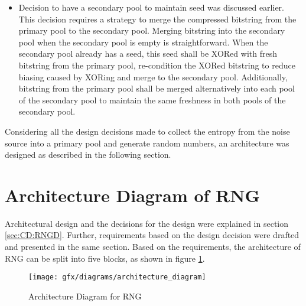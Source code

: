 \begin{itemize}
	\item Decision to have a secondary pool to maintain seed was discussed earlier. This decision requires a strategy to merge the compressed bitstring from the primary pool to the secondary pool. Merging bitstring into the secondary pool when the secondary pool is empty is straightforward. When the secondary pool already has a seed, this seed shall be XORed with fresh bitstring from the primary pool, re-condition the XORed bitstring to reduce biasing caused by XORing and merge to the secondary pool. Additionally, bitstring from the primary pool shall be merged alternatively into each pool of the secondary pool to maintain the same freshness in both pools of the secondary pool.
	 
\end{itemize}

Considering all the design decisions made to collect the entropy from the noise source into a primary pool and generate random numbers, an architecture was designed as described in the following section.

%
%
\section{Architecture Diagram of RNG}
\label{subsec:CD:AD:AD}
Architectural design and the decisions for the design were explained in section \ref{sec:CD:RNGD}. Further, requirements based on the design decision were drafted and presented in the same section. Based on the requirements, the architecture of RNG can be split into five blocks, as shown in figure \ref{fig:4:10}.

\begin{figure}[!h]
	\centering
	\texttt{[image: gfx/diagrams/architecture\_diagram]}
	\caption{Architecture Diagram for RNG}
	\label{fig:4:10}
\end{figure}

